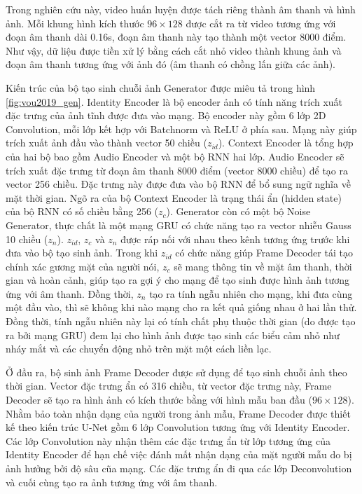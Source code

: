 Trong nghiên cứu này, video huấn luyện được tách riêng thành âm thanh và hình ảnh. Mỗi khung hình kích thước $96\times128$ được cắt ra từ video tương ứng với đoạn âm thanh dài 0.16s, đoạn âm thanh này tạo thành một vector 8000 điểm. Như vậy, dữ liệu được tiền xử lý bằng cách cắt nhỏ video thành khung ảnh và đoạn âm thanh tương ứng với ảnh đó (âm thanh có chồng lấn giữa các ảnh).

Kiến trúc của bộ tạo sinh chuỗi ảnh Generator được miêu tả trong hình \ref{fig:vou2019_gen}. Identity Encoder là bộ encoder ảnh có tính năng trích xuất đặc trưng của ảnh tĩnh được đưa vào mạng. Bộ encoder này gồm 6 lớp 2D Convolution, mỗi lớp kết hợp với Batchnorm và ReLU ở phía sau. Mạng này giúp trích xuất ảnh đầu vào thành vector 50 chiều ($z_{id}$). Context Encoder là tổng hợp của hai bộ bao gồm Audio Encoder và một bộ RNN hai lớp. Audio Encoder sẽ trích xuất đặc trưng từ đoạn âm thanh 8000 điểm (vector 8000 chiều) để tạo ra vector 256 chiều. Đặc trưng này được đưa vào bộ RNN để bổ sung ngữ nghĩa về mặt thời gian. Ngõ ra của bộ Context Encoder là trạng thái ẩn (hidden state) của bộ RNN có số chiều bằng 256 ($z_c$). Generator còn có một bộ Noise Generator, thực chất là một mạng GRU có chức năng tạo ra vector nhiễu Gauss 10 chiều ($z_n$). $z_{id}$, $z_c$ và $z_n$ được ráp nối với nhau theo kênh tương ứng trước khi đưa vào bộ tạo sinh ảnh. Trong khi $z_{id}$ có chức năng giúp Frame Decoder tái tạo chính xác gương mặt của người nói, $z_c$ sẽ mang thông tin về mặt âm thanh, thời gian và hoàn cảnh, giúp tạo ra gợi ý cho mạng để tạo sinh được hình ảnh tương ứng với âm thanh. Đồng thời, $z_n$ tạo ra tính ngẫu nhiên cho mạng, khi đưa cùng một đầu vào, thì sẽ không khi nào mạng cho ra kết quả giống nhau ở hai lần thử. Đồng thời, tính ngẫu nhiên này lại có tính chất phụ thuộc thời gian (do được tạo ra bởi mạng GRU) đem lại cho hình ảnh được tạo sinh các biểu cảm nhỏ như nháy mắt và các chuyển động nhỏ trên mặt một cách liền lạc.

Ở đầu ra, bộ sinh ảnh Frame Decoder được sử dụng để tạo sinh chuỗi ảnh theo thời gian. Vector đặc trưng ẩn có 316 chiều, từ vector đặc trưng này, Frame Decoder sẽ tạo ra hình ảnh có kích thước bằng với hình mẫu ban đầu ($96\times128$). Nhằm bảo toàn nhận dạng của người trong ảnh mẫu, Frame Decoder được thiết kế theo kiến trúc U-Net gồm 6 lớp Convolution tương ứng với Identity Encoder. Các lớp Convolution này nhận thêm các đặc trưng ẩn từ lớp tương ứng của Identity Encoder để hạn chế việc đánh mất nhận dạng của mặt người mẫu do bị ảnh hưởng bởi độ sâu cũa mạng. Các đặc trưng ẩn đi qua các lớp Deconvolution và cuối cùng tạo ra ảnh tương ứng với âm thanh.

